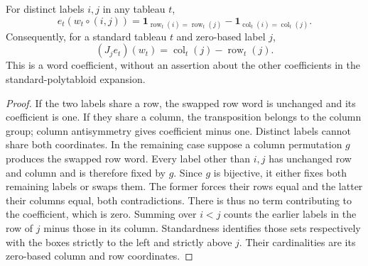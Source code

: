 \begin{lemma}
\label{lem:murphy-content-coefficient}
\leanok
{}
For distinct labels $i,j$ in any tableau $t$,
\[
 e_t(w_t\circ(i,j))
 =\mathbf1_{\operatorname{row}_t(i)=\operatorname{row}_t(j)}
  -\mathbf1_{\operatorname{col}_t(i)=\operatorname{col}_t(j)}.
\]
Consequently, for a standard tableau $t$ and zero-based label $j$,
\[
 (J_je_t)(w_t)=\operatorname{col}_t(j)-\operatorname{row}_t(j).
\]
This is a word coefficient, without an assertion about the other
coefficients in the standard-polytabloid expansion.
\end{lemma}
\begin{proof}
If the two labels share a row, the swapped row word is unchanged and
its coefficient is one. If they share a column, the transposition
belongs to the column group; column antisymmetry gives coefficient
minus one. Distinct labels cannot share both coordinates.
In the remaining case suppose a column permutation $g$ produces the
swapped row word. Every label other than $i,j$ has unchanged row and
column and is therefore fixed by $g$. Since $g$ is bijective, it either
fixes both remaining labels or swaps them. The former forces their
rows equal and the latter their columns equal, both contradictions.
There is thus no term contributing to the coefficient, which is zero.
Summing over $i<j$ counts the earlier labels in the row of $j$ minus
those in its column. Standardness identifies those sets respectively
with the boxes strictly to the left and strictly above $j$. Their
cardinalities are its zero-based column and row coordinates.
\end{proof}

